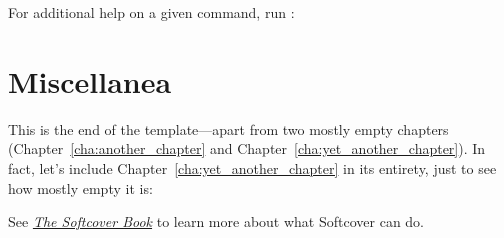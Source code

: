 For additional help on a given command, run :


\section{Miscellanea}

This is the end of the template---apart from two mostly empty chapters (Chapter~\ref{cha:another_chapter} and Chapter~\ref{cha:yet_another_chapter}). In fact, let's include Chapter~\ref{cha:yet_another_chapter} in its entirety, just to see how mostly empty it is:


See \href{http://manual.softcover.org/book}{\emph{The Softcover Book}} to learn more about what Softcover can do.